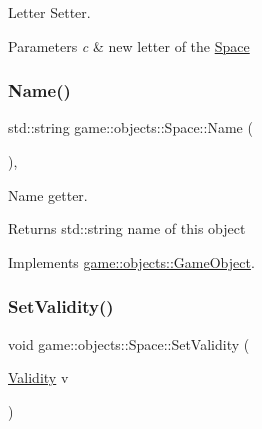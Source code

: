 Letter Setter. 


\begin{DoxyParams}{Parameters}
{\em c} & new letter of the \hyperlink{classgame_1_1objects_1_1Space}{Space} \\
\hline
\end{DoxyParams}
\mbox{\label{classgame_1_1objects_1_1Space_a3df31a4e4a23a99baa7363df9a518705}} 
\subsubsection{\texorpdfstring{Name()}{Name()}}
{\footnotesize\ttfamily std\+::string game\+::objects\+::\+Space\+::\+Name (\begin{DoxyParamCaption}{ }\end{DoxyParamCaption})\hspace{0.3cm}{\ttfamily [override]}, {\ttfamily [virtual]}}



Name getter. 

\begin{DoxyReturn}{Returns}
std\+::string name of this object 
\end{DoxyReturn}


Implements \hyperlink{classgame_1_1objects_1_1GameObject_abc967efcbc66ec93c8592ad785aeb953}{game\+::objects\+::\+Game\+Object}.

\mbox{\label{classgame_1_1objects_1_1Space_a336887def7a71ac60ccfd2bb4a375df7}} 
\subsubsection{\texorpdfstring{Set\+Validity()}{SetValidity()}}
{\footnotesize\ttfamily void game\+::objects\+::\+Space\+::\+Set\+Validity (\begin{DoxyParamCaption}\item[{\hyperlink{Validity_8h_acb8ce664e8a953fe8c27d7f0b37cbca4}{Validity}}]{v }\end{DoxyParamCaption})}



